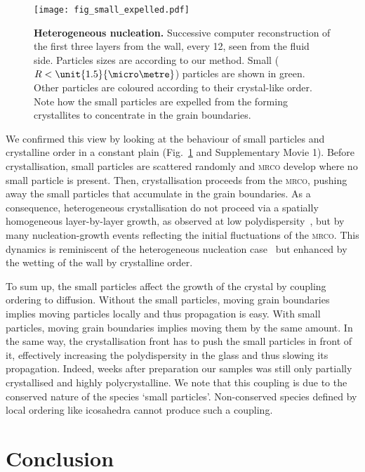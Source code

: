 \documentclass[8.5pt,twoside,twocolumn]{article}
\begin{document}
\begin{figure}
	\centering
	\texttt{[image: fig\_small\_expelled.pdf]}
	\caption{\textbf{Heterogeneous nucleation.} Successive computer reconstruction of the first three layers from the wall, every \unit{12}{\hour}, seen from the fluid side. Particles sizes are according to our method. Small ($R<\unit{1.5}{\micro\metre}$) particles are shown in green. Other particles are coloured according to their crystal-like order. Note how the small particles are expelled from the forming crystallites to concentrate in the grain boundaries.}
	\label{fig:small_expelled}
\end{figure}

We confirmed this view by looking at the behaviour of small particles and crystalline order in a constant plain (Fig.~\ref{fig:small_expelled} and Supplementary Movie 1). Before crystallisation, small particles are scattered randomly and \textsc{mrco} develop where no small particle is present. Then, crystallisation proceeds from the \textsc{mrco}, pushing away the small particles that accumulate in the grain boundaries. As a consequence, heterogeneous crystallisation do not proceed via a spatially homogeneous layer-by-layer growth, as observed at low polydispersity~\cite{Sandomirski2011}, but by many nucleation-growth events reflecting the initial fluctuations of the \textsc{mrco}. This dynamics is reminiscent of the heterogeneous nucleation case~\cite{Kawasaki2010c} but enhanced by the wetting of the wall by crystalline order.

To sum up, the small particles affect the growth of the crystal by coupling ordering to diffusion. Without the small particles, moving grain boundaries implies moving particles locally and thus propagation is easy. With small particles, moving grain boundaries implies moving them by the same amount. In the same way, the crystallisation front has to push the small particles in front of it, effectively increasing the polydispersity in the glass and thus slowing its propagation. Indeed, weeks after preparation our samples was still only partially crystallised and highly polycrystalline. We note that this coupling is due to the conserved nature of the species `small particles'. Non-conserved species defined by local ordering like icosahedra cannot produce such a coupling.

\section{Conclusion}
\end{document}
